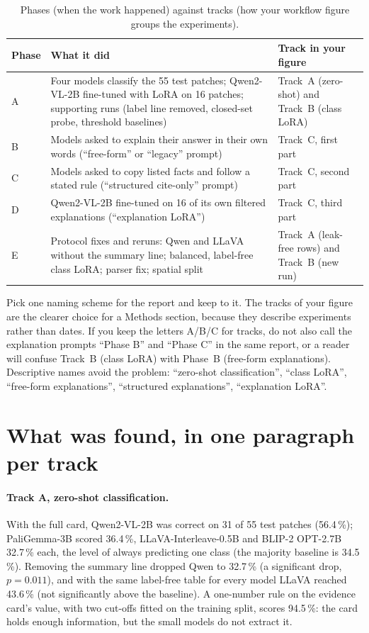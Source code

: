 \begin{table}[H]
\centering
\caption{Phases (when the work happened) against tracks (how your workflow figure groups the experiments).}
\label{tab:phasetrack}
\small
\begin{tabularx}{\textwidth}{lYY}
\toprule
Phase & What it did & Track in your figure \\
\midrule
A & Four models classify the 55 test patches; Qwen2-VL-2B fine-tuned with LoRA on 16 patches; supporting runs (label line removed, closed-set probe, threshold baselines) & Track~A (zero-shot) and Track~B (class LoRA) \\
B & Models asked to explain their answer in their own words (``free-form'' or ``legacy'' prompt) & Track~C, first part \\
C & Models asked to copy listed facts and follow a stated rule (``structured cite-only'' prompt) & Track~C, second part \\
D & Qwen2-VL-2B fine-tuned on 16 of its own filtered explanations (``explanation LoRA'') & Track~C, third part \\
E & Protocol fixes and reruns: Qwen and LLaVA without the summary line; balanced, label-free class LoRA; parser fix; spatial split & Track~A (leak-free rows) and Track~B (new run) \\
\bottomrule
\end{tabularx}
\end{table}

\begin{foryourreport}
Pick one naming scheme for the report and keep to it. The tracks of your figure are the clearer choice for a Methods section, because they describe experiments rather than dates. If you keep the letters A/B/C for tracks, do not also call the explanation prompts ``Phase B'' and ``Phase C'' in the same report, or a reader will confuse Track~B (class LoRA) with Phase~B (free-form explanations). Descriptive names avoid the problem: ``zero-shot classification'', ``class LoRA'', ``free-form explanations'', ``structured explanations'', ``explanation LoRA''.
\end{foryourreport}

\section{What was found, in one paragraph per track}

\paragraph{Track A, zero-shot classification.} With the full card, Qwen2-VL-2B was correct on 31 of 55 test patches (56.4\,\%); PaliGemma-3B scored 36.4\,\%, LLaVA-Interleave-0.5B and BLIP-2 OPT-2.7B 32.7\,\% each, the level of always predicting one class (the majority baseline is 34.5\,\%). Removing the summary line dropped Qwen to 32.7\,\% (a significant drop, $p = 0.011$), and with the same label-free table for every model LLaVA reached 43.6\,\% (not significantly above the baseline). A one-number rule on the evidence card's \dndvi{} value, with two cut-offs fitted on the training split, scores 94.5\,\%: the card holds enough information, but the small models do not extract it.

